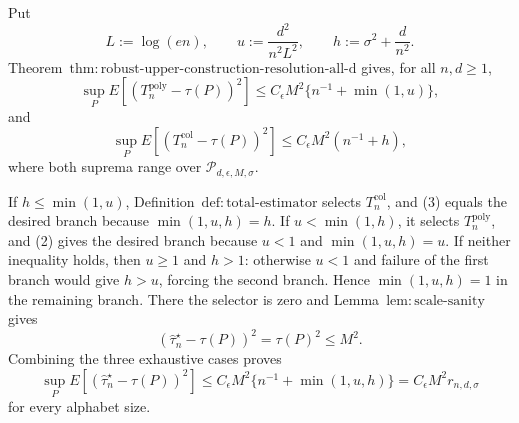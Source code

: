 Put
\[
 L:=\log(en),\qquad u:=\frac{d^2}{n^2L^2},
 \qquad h:=\sigma^2+\frac d{n^2}.
\tag{1}
\]
Theorem~\(\mathrm{thm:robust\text{-}upper\text{-}construction\text{-}resolution\text{-}all\text{-}d}\) gives, for all \(n,d\ge1\),
\[
 \sup_P E[(T_n^{\mathrm{poly}}-\tau(P))^2]
 \le C_{\epsilon}M^2\{n^{-1}+\min(1,u)\},
\tag{2}
\]
and
\[
 \sup_P E[(T_n^{\mathrm{col}}-\tau(P))^2]
 \le C_{\epsilon}M^2(n^{-1}+h),
\tag{3}
\]
where both suprema range over \(\mathcal P_{d,\epsilon,M,\sigma}\).

If \(h\le\min(1,u)\), Definition~\(\mathrm{def:total\text{-}estimator}\) selects \(T_n^{\mathrm{col}}\), and (3) equals the desired branch because \(\min(1,u,h)=h\).  If \(u<\min(1,h)\), it selects \(T_n^{\mathrm{poly}}\), and (2) gives the desired branch because \(u<1\) and \(\min(1,u,h)=u\).  If neither inequality holds, then \(u\ge1\) and \(h>1\): otherwise \(u<1\) and failure of the first branch would give \(h>u\), forcing the second branch.  Hence \(\min(1,u,h)=1\) in the remaining branch.  There the selector is zero and Lemma~\(\mathrm{lem:scale\text{-}sanity}\) gives
\[
 (\widehat\tau_n^{\star}-\tau(P))^2=\tau(P)^2\le M^2.
\tag{4}
\]
Combining the three exhaustive cases proves
\[
 \sup_P E[(\widehat\tau_n^{\star}-\tau(P))^2]
 \le C_{\epsilon}M^2\{n^{-1}+\min(1,u,h)\}
 =C_{\epsilon}M^2r_{n,d,\sigma}
\tag{5}
\]
for every alphabet size.